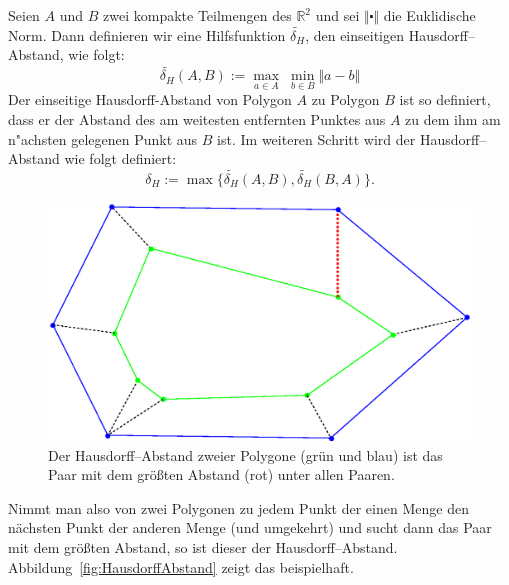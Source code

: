 Seien $A$ und $B$ zwei kompakte Teilmengen des $\mathbb{R}^2$ und sei $\Vert\centerdot\Vert$ die Euklidische Norm.
Dann definieren wir eine Hilfsfunktion $ \widetilde{\delta_H}  $, den einseitigen Hausdorff--Abstand, wie folgt:
\[ \widetilde{\delta_H}(A,B):=\max_{a\in A} \;\min_{b\in B} \Vert a-b \Vert\]
Der einseitige Hausdorff-Abstand von Polygon $A$ zu Polygon $B$ ist so definiert, dass er der Abstand des am weitesten entfernten Punktes aus $A$ zu dem ihm am n"achsten gelegenen Punkt aus $B$ ist.  Im weiteren Schritt wird der Hausdorff--Abstand wie folgt definiert: 
\[\delta_H:=\max\{\widetilde{\delta_H}(A,B),\widetilde{\delta_H}(B,A)\}.\]
\begin{figure}
	\centering
	\includegraphics[scale=.6]{Hausdorff.eps}
	\caption[Der Hausdorff--Abstand zweier Polygone]{Der Hausdorff--Abstand zweier Polygone (grün und blau) ist das Paar mit dem größten Abstand (rot) unter allen Paaren.}
	\label{fig:HausdorffAbstand}
\end{figure}
Nimmt man also von zwei Polygonen zu jedem Punkt der einen Menge den nächsten Punkt der anderen Menge (und umgekehrt) und sucht dann das Paar mit dem größten Abstand, so ist dieser der Hausdorff--Abstand. Abbildung~\vref{fig:HausdorffAbstand} zeigt das beispielhaft.



